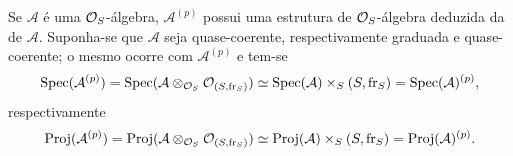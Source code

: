 Se $\mathcal{A}$ é uma $\mathcal{O}_S$-álgebra, $\mathcal{A}^{(p)}$ possui uma estrutura de $\mathcal{O}_S$-álgebra deduzida da de $\mathcal{A}$. Suponha-se que $\mathcal{A}$ seja quase-coerente, respectivamente graduada e quase-coerente; o mesmo ocorre com $\mathcal{A}^{(p)}$ e tem-se
\[
\operatorname{Spec}(\mathcal{A}^{(p)})=\operatorname{Spec}(\mathcal{A}\otimes_{\mathcal{O}_S}\mathcal{O}_{(S,\operatorname{fr}_S)})
 \simeq \operatorname{Spec}(\mathcal{A})\times_S(S,\operatorname{fr}_S)=\operatorname{Spec}(\mathcal{A})^{(p)},
\]
respectivamente
\[
\operatorname{Proj}(\mathcal{A}^{(p)})=\operatorname{Proj}(\mathcal{A}\otimes_{\mathcal{O}_S}\mathcal{O}_{(S,\operatorname{fr}_S)})
 \simeq \operatorname{Proj}(\mathcal{A})\times_S(S,\operatorname{fr}_S)=\operatorname{Proj}(\mathcal{A})^{(p)}.
\]
